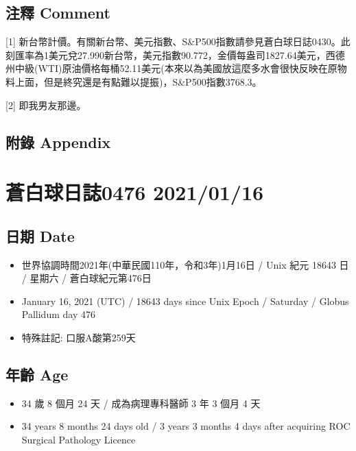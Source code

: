 \documentclass[a5paper, 11pt
]{book}
\providecommand{\tightlist}{%
  \setlength{\itemsep}{0pt}\setlength{\parskip}{0pt}}
\begin{document}
\hypertarget{ux6ce8ux91cb-comment-45}{%
\subsection{注釋 Comment}\label{ux6ce8ux91cb-comment-45}}

{[}1{]}
新台幣計價。有關新台幣、美元指數、S\&P500指數請參見蒼白球日誌0430。此刻匯率為1美元兌27.990新台幣，美元指數90.772，金價每盎司1827.64美元，西德州中級(WTI)原油價格每桶52.11美元(本來以為美國放這麼多水會很快反映在原物料上面，但是終究還是有點難以提振)，S\&P500指數3768.3。

{[}2{]} 即我男友那邊。

\hypertarget{ux9644ux9304-appendix-45}{%
\subsection{附錄 Appendix}\label{ux9644ux9304-appendix-45}}

\hypertarget{ux84bcux767dux7403ux65e5ux8a8c0476-20210116}{%
\section{蒼白球日誌0476
2021/01/16}\label{ux84bcux767dux7403ux65e5ux8a8c0476-20210116}}

\hypertarget{ux65e5ux671f-date-46}{%
\subsection{日期 Date}\label{ux65e5ux671f-date-46}}

\begin{itemize}
\tightlist
\item
  世界協調時間2021年(中華民國110年，令和3年)1月16日 / Unix 紀元 18643 日
  / 星期六 / 蒼白球紀元第476日
\item
  January 16, 2021 (UTC) / 18643 days since Unix Epoch / Saturday /
  Globus Pallidum day 476
\item
  特殊註記: 口服A酸第259天
\end{itemize}

\hypertarget{ux5e74ux9f61-age-46}{%
\subsection{年齡 Age}\label{ux5e74ux9f61-age-46}}

\begin{itemize}
\tightlist
\item
  34 歲 8 個月 24 天 / 成為病理專科醫師 3 年 3 個月 4 天
\item
  34 years 8 months 24 days old / 3 years 3 months 4 days after
  acquiring ROC Surgical Pathology Licence
\end{itemize}
\end{document}
